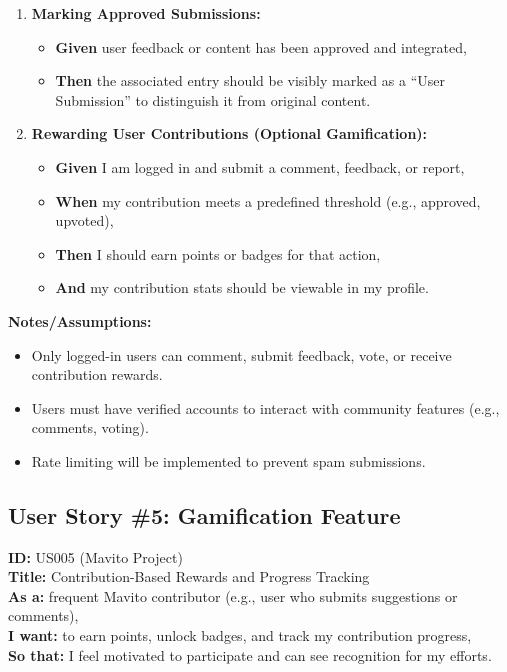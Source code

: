\documentclass[12pt]{article}
\begin{document}
\begin{enumerate}
    \item \textbf{Marking Approved Submissions:}
    \begin{itemize}
        \item \textbf{Given} user feedback or content has been approved and integrated,
        \item \textbf{Then} the associated entry should be visibly marked as a ``User Submission'' to distinguish it from original content.
    \end{itemize}

    \item \textbf{Rewarding User Contributions (Optional Gamification):}
    \begin{itemize}
        \item \textbf{Given} I am logged in and submit a comment, feedback, or report,
        \item \textbf{When} my contribution meets a predefined threshold (e.g., approved, upvoted),
        \item \textbf{Then} I should earn points or badges for that action,
        \item \textbf{And} my contribution stats should be viewable in my profile.
    \end{itemize}
\end{enumerate}

\vspace{1em}
\textbf{Notes/Assumptions:}
\begin{itemize}
    \item Only logged-in users can comment, submit feedback, vote, or receive contribution rewards.
    \item Users must have verified accounts to interact with community features (e.g., comments, voting).
    \item Rate limiting will be implemented to prevent spam submissions.
\end{itemize}

\subsection{User Story \#5: Gamification Feature}

\textbf{ID:} US005 (Mavito Project) \\
\textbf{Title:} Contribution-Based Rewards and Progress Tracking \\
\textbf{As a:} frequent Mavito contributor (e.g., user who submits suggestions or comments), \\
\textbf{I want:} to earn points, unlock badges, and track my contribution progress, \\
\textbf{So that:} I feel motivated to participate and can see recognition for my efforts.
\end{document}
